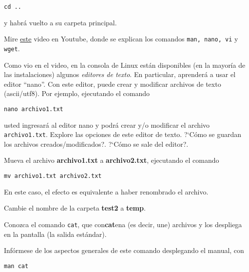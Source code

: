 \documentclass[11pt]{exam}
\begin{document}
\begin{questions}
\begin{parts}
\begin{verbatim}
cd ..
\end{verbatim}

y habrá vuelto a su carpeta principal.

\item Mire \href{https://www.youtube.com/watch?v=4Cz8E71PYd4}{este} video en Youtube, donde se explican los comandos \texttt{man, nano, vi} y \texttt{wget}.

\item Como vio en el video, en la consola de Linux están disponibles (en la mayoría de las instalaciones) algunos \textit{editores de texto}. En particular, aprenderá a usar el editor ``nano''. Con este editor, puede crear y modificar archivos de texto (ascii/utf8). Por ejemplo, ejecutando el comando 

\begin{verbatim}
nano archivo1.txt
\end{verbatim}

usted ingresará al editor nano y podrá crear y/o modificar el archivo \texttt{archivo1.txt}.
 Explore las opciones de este editor de texto. ?`Cómo se guardan los archivos creados/modi\-fi\-ca\-dos?. ?`Cómo se sale del editor?.

\item Mueva el archivo \textbf{archivo1.txt} a \textbf{archivo2.txt}, ejecutando el comando

\begin{verbatim}
mv archivo1.txt archivo2.txt
\end{verbatim}

En este caso, el efecto es equivalente a haber renombrado el archivo.

\item Cambie el nombre de la carpeta \textbf{test2} a \textbf{temp}.

\end{parts}

\item Conozca el comando \texttt{cat}, que con\textbf{cat}ena (es decir, une) archivos y los despliega en la pantalla (la salida estándar).
\begin{parts}
\item  Infórmese de los aspectos generales de este comando desplegando el manual, con 

\begin{verbatim}
man cat
\end{verbatim}




\end{parts}
\end{questions}
\end{document}
